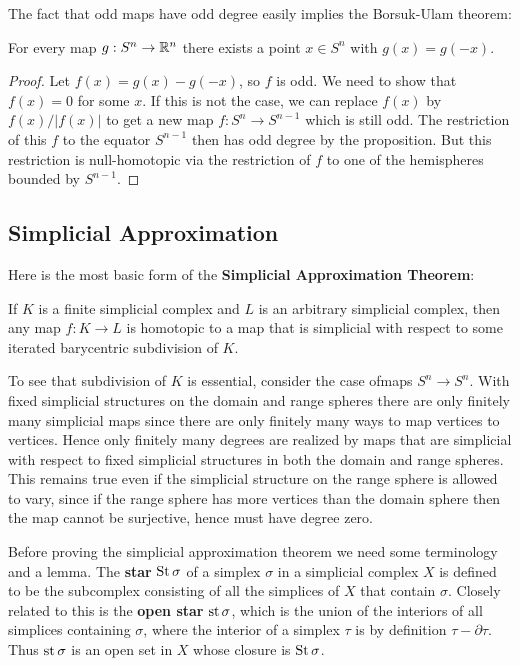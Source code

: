 The fact that odd maps have odd degree easily implies the Borsuk-Ulam theorem:
\begin{theorem}
For every map $g:S^n\to\mathbb{R}^n$ there exists a point $x\in S^n$ with $g(x)=g(-x)$.
\end{theorem}
\begin{proof}
Let $f(x)=g(x)-g(-x)$, so $f$ is odd. We need to show that $f(x)=0$ for some $x$. If this is not the case, we can replace $f(x)$ by $f(x)/|f(x)|$ to get a new map $f:S^n\to S^{n-1}$ which is still odd. The restriction of this $f$ to the equator $S^{n-1}$ then has odd degree by the proposition. But this restriction is null-homotopic via the restriction of $f$ to one of the hemispheres bounded by $S^{n-1}$.
\end{proof}
\subsection{Simplicial Approximation}
Here is the most basic form of the \textbf{Simplicial Approximation Theorem}:
\begin{theorem}\label{Simplicial Approximation}
If $K$ is a finite simplicial complex and $L$ is an arbitrary simplicial
complex, then any map $f:K\to L$ is homotopic to a map that is simplicial with respect to some iterated barycentric subdivision of $K$.
\end{theorem}
To see that subdivision of $K$ is essential, consider the case ofmaps $S^n\to S^n$. With fixed simplicial structures on the domain and range spheres there are only finitely many simplicial maps since there are only finitely many ways to map vertices to vertices. Hence only finitely many degrees are realized by maps that are simplicial with respect to fixed simplicial structures in both the domain and range spheres. This remains true even if the simplicial structure on the range sphere is allowed to vary, since if the range sphere has more vertices than the domain sphere then the map cannot be surjective, hence must have degree zero.\par
Before proving the simplicial approximation theorem we need some terminology and a lemma. The \textbf{star} $\mathrm{St}\,\sigma$ of a simplex $\sigma$ in a simplicial complex $X$ is defined to be the subcomplex consisting of all the simplices of $X$ that contain $\sigma$. Closely related to this is the \textbf{open star} $\mathrm{st}\,\sigma$, which is the union of the interiors of all simplices containing $\sigma$, where the interior of a simplex $\tau$ is by definition $\tau-\partial\tau$. Thus $\mathrm{st}\,\sigma$ is an open set in $X$ whose closure is $\mathrm{St}\,\sigma$.
